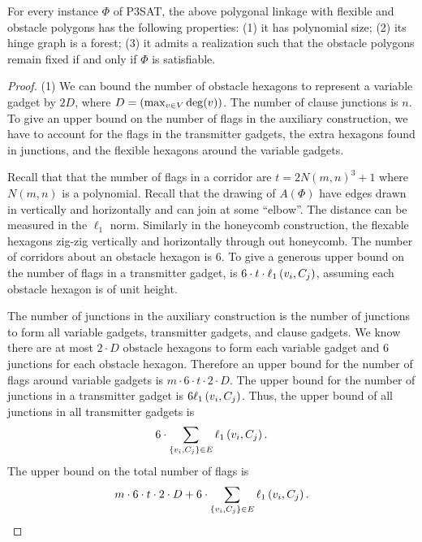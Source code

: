 \begin{lem}\label{lem:aux-A}
For every instance $\Phi$ of P3SAT, the above polygonal linkage with flexible and obstacle polygons has the following properties: (1) it has polynomial size; (2) its hinge graph is a forest;
(3) it admits a realization such that the obstacle polygons remain fixed if and only if $\Phi$ is satisfiable.
\end{lem}
\begin{proof}


\noindent (1) We can bound the number of obstacle hexagons to represent a variable gadget by $2 D$, where $D = \left(  \max_{v \in V} \deg (v) \right)$.  
The number of clause junctions is $n$.
To give an upper bound on the number of flags in the auxiliary construction, we have to account for the flags in the transmitter gadgets, the extra hexagons found in junctions, and the flexible hexagons around the variable gadgets.

Recall that that the number of flags in a corridor are $ t = 2N(m,n)^3 + 1 $ where $N(m,n)$ is a polynomial. 
Recall that the drawing of $A(\Phi)$ have edges drawn in vertically and horizontally and can join at some ``elbow''.  
The distance can be measured in the $\ell_1$ norm.
Similarly in the honeycomb construction, the flexable hexagons zig-zig vertically and horizontally through out honeycomb.  
The number of corridors about an obstacle hexagon is $6$.
To give a generous upper bound on the number of flags in a transmitter gadget, is $6 \cdot t \cdot \ell_1\left( v_i,C_j \right)$, assuming each obstacle hexagon is of unit height.

The number of junctions in the auxiliary construction is the number of junctions to form all variable gadgets, transmitter gadgets, and clause gadgets. 
We know there are at most $2 \cdot D$ obstacle hexagons to form each variable gadget and $6$ junctions for each obstacle hexagon.  
Therefore an upper bound for the number of flags around variable gadgets is $m \cdot 6 \cdot t \cdot 2 \cdot D$.
The upper bound for the number of junctions in a transmitter gadget is $6 \ell_1 \left( v_i, C_j \right)$.  
Thus, the upper bound of all junctions in all transmitter gadgets is $$6 \cdot \sum_{\left\lbrace v_i, C_j \right\rbrace \in E} \ell_1 \left( v_i, C_j \right).$$
The upper bound on the total number of flags is
$$m \cdot 6 \cdot t \cdot 2 \cdot D + 6 \cdot \sum_{\left\lbrace v_i, C_j \right\rbrace \in E} \ell_1 \left( v_i, C_j \right).$$


\end{proof}
